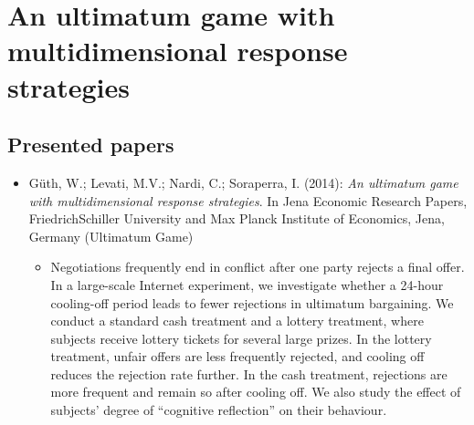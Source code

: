 

\chapter{An ultimatum game with multidimensional response strategies} 

\section{Presented papers}


\begin{itemize}
	\item Güth, W.; Levati, M.V.; Nardi, C.; Soraperra, I. (2014): \textit{An ultimatum game with multidimensional response strategies}. In Jena Economic Research Papers, FriedrichSchiller University and Max Planck Institute of Economics, Jena, Germany (Ultimatum Game)
		\begin{itemize}
			\item Negotiations frequently end in conflict after one party rejects a final offer. In a large-scale Internet experiment, we investigate whether a 24-hour cooling-off period leads to fewer rejections in ultimatum bargaining. We conduct a standard cash treatment and a lottery treatment, where subjects receive lottery tickets for several large prizes. In the lottery treatment, unfair offers are less frequently rejected, and cooling off reduces the rejection rate further. In the cash treatment, rejections are more frequent and remain so after cooling off. We also study the effect of subjects’ degree of “cognitive reflection” on their behaviour.
		\end{itemize}
\end{itemize}


\newpage